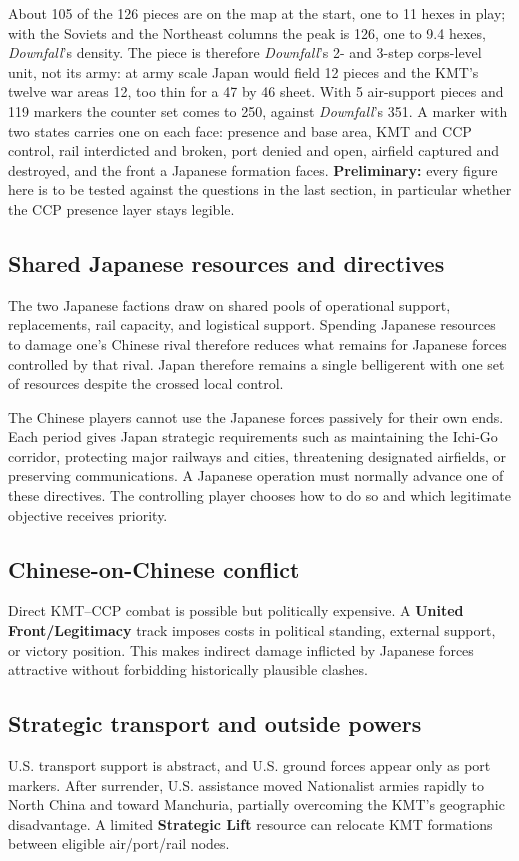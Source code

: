 \documentclass[11pt]{article}
\begin{document}
About 105 of the 126 pieces are on the map at the start, one to 11 hexes in play; with the Soviets and the Northeast columns the peak is 126, one to 9.4 hexes, \emph{Downfall}'s density. The piece is therefore \emph{Downfall}'s 2- and 3-step corps-level unit, not its army: at army scale Japan would field 12 pieces and the KMT's twelve war areas 12, too thin for a 47 by 46 sheet. With 5 air-support pieces and 119 markers the counter set comes to 250, against \emph{Downfall}'s 351. A marker with two states carries one on each face: presence and base area, KMT and CCP control, rail interdicted and broken, port denied and open, airfield captured and destroyed, and the front a Japanese formation faces. \textbf{Preliminary:} every figure here is to be tested against the questions in the last section, in particular whether the CCP presence layer stays legible.

\subsection{Shared Japanese resources and directives}
The two Japanese factions draw on shared pools of operational support, replacements, rail capacity, and logistical support. Spending Japanese resources to damage one's Chinese rival therefore reduces what remains for Japanese forces controlled by that rival. Japan therefore remains a single belligerent with one set of resources despite the crossed local control.

The Chinese players cannot use the Japanese forces passively for their own ends. Each period gives Japan strategic requirements such as maintaining the Ichi-Go corridor, protecting major railways and cities, threatening designated airfields, or preserving communications. A Japanese operation must normally advance one of these directives. The controlling player chooses how to do so and which legitimate objective receives priority.

\subsection{Chinese-on-Chinese conflict}
Direct KMT--CCP combat is possible but politically expensive. A \textbf{United Front/Legitimacy} track imposes costs in political standing, external support, or victory position. This makes indirect damage inflicted by Japanese forces attractive without forbidding historically plausible clashes.

\subsection{Strategic transport and outside powers}
U.S. transport support is abstract, and U.S. ground forces appear only as port markers. After surrender, U.S. assistance moved Nationalist armies rapidly to North China and toward Manchuria, partially overcoming the KMT's geographic disadvantage. A limited \textbf{Strategic Lift} resource can relocate KMT formations between eligible air/port/rail nodes.
\end{document}
